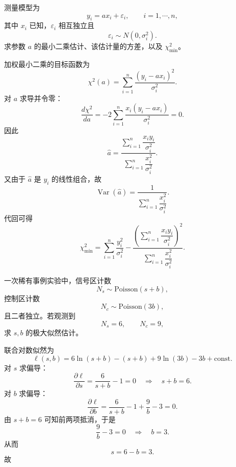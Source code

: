 \begin{question}
测量模型为
\[
y_i=ax_i+\varepsilon_i,\qquad i=1,\cdots,n,
\]
其中 $x_i$ 已知，$\varepsilon_i$ 相互独立且
\[
\varepsilon_i\sim N(0,\sigma_i^2).
\]
求参数 $a$ 的最小二乘估计、该估计量的方差，以及 $\chi^2_{\min}$。
\begin{solution}
加权最小二乘的目标函数为
\[
\chi^2(a)=\sum_{i=1}^n \frac{(y_i-ax_i)^2}{\sigma_i^2}.
\]
对 $a$ 求导并令零：
\[
\frac{d\chi^2}{da}=-2\sum_{i=1}^n \frac{x_i(y_i-ax_i)}{\sigma_i^2}=0.
\]
因此
\[
\hat a=\frac{\sum_{i=1}^n \dfrac{x_i y_i}{\sigma_i^2}}
{\sum_{i=1}^n \dfrac{x_i^2}{\sigma_i^2}}.
\]
又由于 $\hat a$ 是 $y_i$ 的线性组合，故
\[
\operatorname{Var}(\hat a)=\frac{1}{\sum_{i=1}^n \dfrac{x_i^2}{\sigma_i^2}}.
\]
代回可得
\[
\chi^2_{\min}
=\sum_{i=1}^n \frac{y_i^2}{\sigma_i^2}
-\frac{\left(\sum_{i=1}^n \dfrac{x_i y_i}{\sigma_i^2}\right)^2}
{\sum_{i=1}^n \dfrac{x_i^2}{\sigma_i^2}}.
\]
\end{solution}
\end{question}

\begin{question}
一次稀有事例实验中，信号区计数
\[
N_s\sim \mathrm{Poisson}(s+b),
\]
控制区计数
\[
N_c\sim \mathrm{Poisson}(3b),
\]
且二者独立。若观测到
\[
N_s=6,\qquad N_c=9,
\]
求 $s,b$ 的极大似然估计。
\begin{solution}
联合对数似然为
\[
\ell(s,b)=6\ln(s+b)-(s+b)+9\ln(3b)-3b+\text{const}.
\]
对 $s$ 求偏导：
\[
\frac{\partial \ell}{\partial s}=\frac{6}{s+b}-1=0
\quad\Longrightarrow\quad
s+b=6.
\]
对 $b$ 求偏导：
\[
\frac{\partial \ell}{\partial b}=\frac{6}{s+b}-1+\frac{9}{b}-3=0.
\]
由 $s+b=6$ 可知前两项抵消，于是
\[
\frac{9}{b}-3=0\quad\Longrightarrow\quad b=3.
\]
从而
\[
s=6-b=3.
\]
故
\end{solution}
\end{question}

